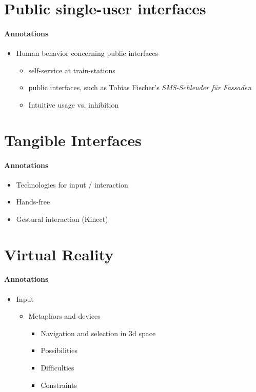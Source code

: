 
\section{Public single-user interfaces}
\label{related_work_single}

\paragraph{Annotations}

\begin{itemize}
	\item Human behavior concerning public interfaces
	\begin{itemize}
		\item self-service at train-stations
		\item public interfaces, such as Tobias Fischer's \textit{SMS-Schleuder für Fassaden}
		\item Intuitive usage vs. inhibition
	\end{itemize}
\end{itemize}

\section{Tangible Interfaces}
\label{related_work_tangible}

\paragraph{Annotations}

\begin{itemize}
	\item Technologies for input / interaction
	\item Hands-free
	\item Gestural interaction (Kinect)
\end{itemize}


\section{Virtual Reality}
\label{related_work_vr}

\paragraph{Annotations}

\begin{itemize}
	\item Input
	\begin{itemize}
		\item Metaphors and devices
		\begin{itemize}
			\item Navigation and selection in 3d space
			\item Possibilities
			\item Difficulties
			\item Constraints
		\end{itemize}
	\end{itemize}
\end{itemize}
